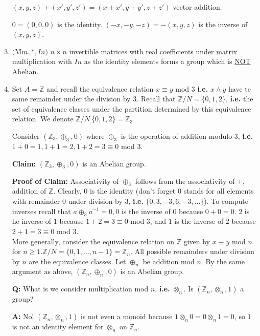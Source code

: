 \documentclass[10pt]{article}
\begin{document}
\begin{description}
\begin{enumerate}
			\item[] $(x, y, z)+(x', y', z') = (x+x', y+y', z+z')$ vector addition.
			\item[] $0 = (0, 0, 0)$ is the identity. \hspace{10mm} $(-x, -y, -z) = - (x, y, z)$ is the inverse of $(x, y, z)$.
			\item $($\~{M}$m, *, In)$ $n\times n$ invertible matrices with real coefficients under matrix multiplication with $In$ as the identity elements forms a group which is \underline{NOT} Abelian.
			\item Set $A = \mathbb{Z}$ and recall the equivalence relation $x \equiv y$ mod $3$ \textbf{i.e.} $x \land y$ have te same remainder under the division by $3$. Recall that $\mathbb{Z} / N = \{0, 1, 2\}$, \textbf{i.e.} the set of equivalence classes under the partition determined by this equivalence relation. We denote $\mathbb{Z} / N \ \{0, 1, 2\} = \mathbb{Z}_3$
			\item[] Consider $(\mathbb{Z}_3, \oplus _3, 0)$ where $\oplus _3$ is the operation of addition modulo $3$, \textbf{i.e.} $1+0=1, 1+1=2, 1+2=3 \equiv 0$ mod $3$.
			\item[\textbf{Claim:}] $(\mathbb{Z}_3, \oplus _3, 0)$ is an Abelian group.
			\item[\textbf{Proof of Claim:}] Associativity of $\oplus _3$ follows from the associativity of $+$, addition of $\mathbb{Z}$. Clearly, $0$ is the identity (don't forget $0$ stands for all elements with remainder $0$ under division by $3$, \textbf{i.e.} $\{0, 3, -3, 6, -3, \dots\}$). To compute inverses recall that $a \oplus _3 a^{-1} = 0, 0$ is the inverse of $0$ because $0+0=0$. $2$ is he inverse of $1$ because $1+2=3 \equiv 0$ mod $3$, and $1$ is the inverse of $2$ because $2+1=3 \equiv 0$ mod $3$. \\
			More generally, consider the equivalence relation on $\mathbb{Z}$ given by $x \equiv y$ mod $n$ for $n \geq 1. \mathbb{Z} / N = \{0, 1, \dots, n-1\} = \mathbb{Z}_n$. All possible remainders under division by $n$ are the equivalence classes. Let $\oplus _n$ be addition mod $n$. By the same argument as above, $(\mathbb{Z}_n, \oplus _n, 0)$ is an Abelian group.
			\item[\textbf{Q:}] What is we consider multiplication mod $n$, \textbf{i.e.} $\otimes _n$. Is $(\mathbb{Z}_n, \otimes _n, 1)$ a group?
			\item[\textbf{A:}] No! $(\mathbb{Z}_n, \otimes _n, 1)$ is not even a monoid because $1 \otimes _n 0 = 0 \otimes _n 1 = 0$, so $1$ is not an identity element for $\otimes _n$ on $\mathbb{Z}_n$.

\end{enumerate}
\end{description}
\end{document}
